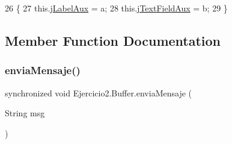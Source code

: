 \begin{DoxyCode}
26      \{
27          this.\mbox{\hyperlink{class_ejercicio2_1_1_buffer_a032718b3d95a8db4bc7846846134e4e6}{jLabelAux}} = a;
28          this.\mbox{\hyperlink{class_ejercicio2_1_1_buffer_a33d8699257b7b05f8023b7a49f7ef7e0}{jTextFieldAux}} = b;
29      \}
\end{DoxyCode}


\subsection{Member Function Documentation}
\mbox{\label{class_ejercicio2_1_1_buffer_ab6e3390ea3256bde697612255687aafc}} 
\subsubsection{\texorpdfstring{envia\+Mensaje()}{enviaMensaje()}}
{\footnotesize\ttfamily synchronized void Ejercicio2.\+Buffer.\+envia\+Mensaje (\begin{DoxyParamCaption}\item[{String}]{msg }\end{DoxyParamCaption})\hspace{0.3cm}{\ttfamily [inline]}}


